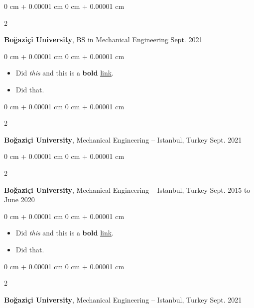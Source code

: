 \documentclass[10pt, letterpaper]{article}
\newenvironment{highlights}{
    \begin{itemize}[
        topsep=0.10 cm,
        parsep=0.10 cm,
        partopsep=0pt,
        itemsep=0pt,
        leftmargin=0 cm + 10pt
    ]
}{
    \end{itemize}
        
    \vspace{-0.10cm}
} %
\newenvironment{onecolentry}{
    \begin{adjustwidth}{
        0 cm + 0.00001 cm
    }{
        0 cm + 0.00001 cm
    }
}{
    \end{adjustwidth}
} %
\newenvironment{twocolentry}[2][]{
    \onecolentry
    \def\secondColumn{#2}
    \setcolumnwidth{\fill, 4.1 cm}
    \begin{paracol}{2}
}{
    \switchcolumn \raggedleft \secondColumn
    \end{paracol}
    \endonecolentry
} %
\begin{document}
        \vspace{0.15 cm}

        \begin{twocolentry}{
            Sept. 2021
        }
            \textbf{Boğaziçi University}, BS in Mechanical Engineering\end{twocolentry}

        \vspace{0.10 cm}
        \begin{onecolentry}
            \begin{highlights}
                \item Did \textit{this} and this is a \textbf{bold} \href{https://example.com}{link}.
                \item Did that.
            \end{highlights}
        \end{onecolentry}


        \vspace{0.15 cm}

        \begin{twocolentry}{
            Sept. 2021
        }
            \textbf{Boğaziçi University}, Mechanical Engineering -- Istanbul, Turkey\end{twocolentry}

        \vspace{0.10 cm}


        \vspace{0.15 cm}

        \begin{twocolentry}{
            Sept. 2015 to June 2020
        }
            \textbf{Boğaziçi University}, Mechanical Engineering -- Istanbul, Turkey\end{twocolentry}

        \vspace{0.10 cm}
        \begin{onecolentry}
            \begin{highlights}
                \item Did \textit{this} and this is a \textbf{bold} \href{https://example.com}{link}.
                \item Did that.
            \end{highlights}
        \end{onecolentry}


        \vspace{0.15 cm}

        \begin{twocolentry}{
            Sept. 2021
        }
            \textbf{Boğaziçi University}, Mechanical Engineering -- Istanbul, Turkey\end{twocolentry}
\end{document}
